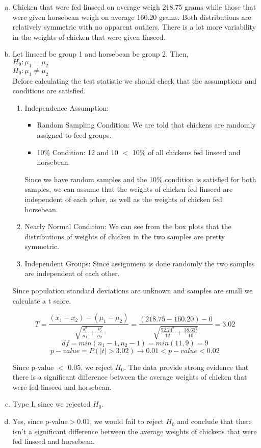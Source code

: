 {
\begin{enumerate}[(a)]
\setlength{\itemsep}{0mm}

\item Chicken that were fed linseed on average weigh 218.75 grams while those that were given horsebean weigh on average 160.20 grams. Both distributions are relatively symmetric with no apparent outliers. There is a lot more variability in the weights of chicken that were given linseed.

\item Let linseed be group 1 and horsebean be group 2. Then,\\
$H_0: \mu_1 = \mu_2$ \\
$H_0: \mu_1 \ne \mu_2$ \\

Before calculating the test statistic we should check that the assumptions and conditions are satisfied.
\begin{enumerate}[1.]
\item Independence Assumption: 
\begin{itemize}
\item Random Sampling Condition: We are told that chickens are randomly assigned to feed groups.
\item 10\% Condition: 12 and 10 $<$ 10\% of all chickens fed linseed and horsebean.
\end{itemize}
Since we have random samples and the 10\% condition is satisfied for both samples, we can assume that the weights of chicken fed linseed are independent of each other, as well as the weights of chicken fed horsebean.
\item Nearly Normal Condition: We can see from the box plots that the distributions of weights of chicken in the two samples are pretty symmetric.
\item Independent Groups: Since assignment is done randomly the two samples are independent of each other.
\end{enumerate}

Since population standard deviations are unknown and samples are small we calculate a t score.

\[ T = \frac{(\bar{x}_1 - \bar{x_2}) - (\mu_1 - \mu_2)}{\sqrt{ \frac{s_1^2}{n_1} + \frac{s_2^2}{n_2} }} = \frac{(218.75 - 160.20) - 0}{ \sqrt{\frac{52.24^2}{12} + \frac{38.63^2}{10}} } = 3.02 \]
\[ df = min(n_1 - 1, n_2 - 1) = min(11,9) = 9 \]
\[ p-value = P(|t| > 3.02) \rightarrow 0.01 < p-value < 0.02 \]

Since p-value $<$ 0.05, we reject $H_0$. The data provide strong evidence that there is a significant difference between the average weights of chicken that were fed linseed and horsebean.

\item Type I, since we rejected $H_0$.

\item Yes, since p-value$> 0.01$, we would fail to reject $H_0$ and conclude that there isn't a significant difference between the average weights of chickens that were fed linseed and horsebean.

\end{enumerate}
}\label{chickwts}

